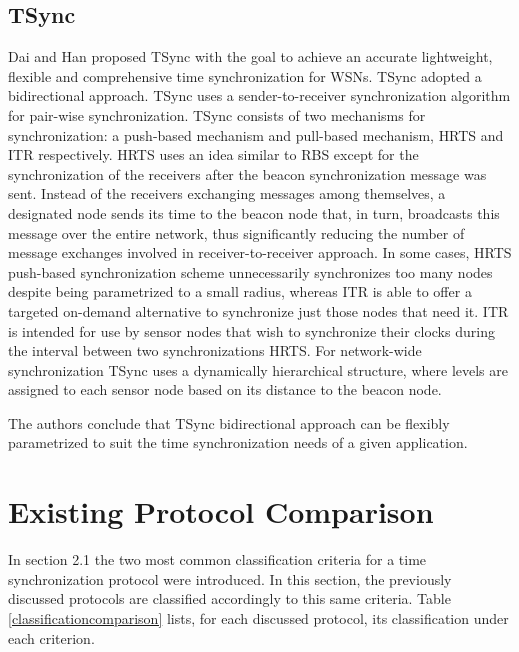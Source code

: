 \subsection{TSync}
Dai and Han proposed TSync \cite{journals/sigmobile/DaiH04} with the goal to achieve an accurate lightweight, flexible and comprehensive time synchronization for WSNs. TSync adopted a bidirectional approach. TSync uses a sender-to-receiver synchronization algorithm for pair-wise synchronization. TSync consists of two mechanisms for synchronization: a push-based mechanism and pull-based mechanism, \ac{HRTS} and \ac{ITR} respectively. HRTS uses an idea similar to RBS except for the synchronization of the receivers after the beacon synchronization message was sent. Instead of the receivers exchanging messages among themselves, a designated node sends its time to the beacon node that, in turn, broadcasts this message over the entire network, thus significantly reducing the number of message exchanges involved in receiver-to-receiver approach. In some cases, HRTS push-based synchronization scheme unnecessarily synchronizes too many nodes despite being parametrized to a small radius, whereas
ITR is able to offer a targeted on-demand alternative to synchronize just those nodes that need it. ITR is intended for use by sensor nodes that wish to synchronize their clocks during the interval between two synchronizations HRTS. For network-wide synchronization TSync uses a dynamically hierarchical structure, where levels are assigned to each sensor node based on its distance to the beacon node.

The authors conclude that TSync bidirectional approach can be flexibly parametrized to suit the time synchronization needs of a given application.

\section{Existing Protocol Comparison}
In section 2.1 the two most common classification criteria for a time synchronization protocol were introduced. In this
section, the previously discussed protocols are classified accordingly to this same criteria. Table \ref{classificationcomparison} lists, for each discussed protocol, its classification under each criterion.

